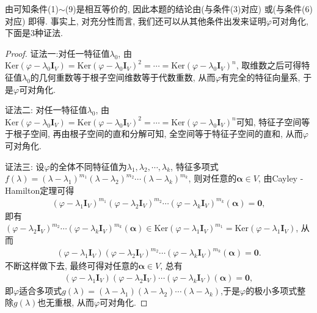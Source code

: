 \documentclass[../../main.tex]{subfiles}%
\begin{document}
\begin{note}
由可知条件(1)$\sim$(9)是相互等价的, 因此本题的结论由(与条件(3)对应) 或(与条件(6)对应) 即得. 事实上, 对充分性而言, 我们还可以从其他条件出发来证明\(\varphi\)可对角化, 下面是\(3\)种证法.
\end{note}
\begin{proof}

{\color{blue}证法一:}对任一特征值\(\lambda_{0}\), 由\(\mathrm{Ker}(\varphi-\lambda_{0}\boldsymbol{I}_{V})=\mathrm{Ker}(\varphi-\lambda_{0}\boldsymbol{I}_{V})^{2}=\cdots=\mathrm{Ker}(\varphi-\lambda_{0}\boldsymbol{I}_{V})^{n}\), 取维数之后可得特征值\(\lambda_{0}\)的几何重数等于根子空间维数等于代数重数, 从而\(\varphi\)有完全的特征向量系, 于是\(\varphi\)可对角化.
    
{\color{blue}证法二:} 对任一特征值\(\lambda_{0}\), 由\(\mathrm{Ker}(\varphi-\lambda_{0}\boldsymbol{I}_{V})=\mathrm{Ker}(\varphi-\lambda_{0}\boldsymbol{I}_{V})^{2}=\cdots=\mathrm{Ker}(\varphi-\lambda_{0}\boldsymbol{I}_{V})^{n}\)可知, 特征子空间等于根子空间, 再由根子空间的直和分解可知, 全空间等于特征子空间的直和, 从而\(\varphi\)可对角化.

{\color{blue}证法三:} 设\(\varphi\)的全体不同特征值为\(\lambda_{1},\lambda_{2},\cdots,\lambda_{k}\), 特征多项式\(f(\lambda)=(\lambda-\lambda_{1})^{m_{1}}(\lambda-\lambda_{2})^{m_{2}}\cdots(\lambda-\lambda_{k})^{m_{k}}\), 则对任意的\(\boldsymbol{\alpha}\in V\), 由Cayley - Hamilton定理可得
\begin{align*}
(\varphi-\lambda_{1}\boldsymbol{I}_{V})^{m_{1}}(\varphi-\lambda_{2}\boldsymbol{I}_{V})^{m_{2}}\cdots(\varphi-\lambda_{k}\boldsymbol{I}_{V})^{m_{k}}(\boldsymbol{\alpha}) = \boldsymbol{0},
\end{align*}
即有\((\varphi-\lambda_{2}\boldsymbol{I}_{V})^{m_{2}}\cdots(\varphi-\lambda_{k}\boldsymbol{I}_{V})^{m_{k}}(\boldsymbol{\alpha})\in\mathrm{Ker}(\varphi-\lambda_{1}\boldsymbol{I}_{V})^{m_{1}}=\mathrm{Ker}(\varphi-\lambda_{1}\boldsymbol{I}_{V})\), 从而
\begin{align*}
(\varphi-\lambda_{1}\boldsymbol{I}_{V})(\varphi-\lambda_{2}\boldsymbol{I}_{V})^{m_{2}}\cdots(\varphi-\lambda_{k}\boldsymbol{I}_{V})^{m_{k}}(\boldsymbol{\alpha}) = \boldsymbol{0}.
\end{align*}
不断这样做下去, 最终可得对任意的\(\boldsymbol{\alpha}\in V\), 总有
\begin{align*}
(\varphi-\lambda_{1}\boldsymbol{I}_{V})(\varphi-\lambda_{2}\boldsymbol{I}_{V})\cdots(\varphi-\lambda_{k}\boldsymbol{I}_{V})(\boldsymbol{\alpha}) = \boldsymbol{0},
\end{align*}
即\(\varphi\)适合多项式\(g(\lambda)=(\lambda-\lambda_{1})(\lambda-\lambda_{2})\cdots(\lambda-\lambda_{k})\),于是$\varphi$的极小多项式整除$g(\lambda)$也无重根, 从而\(\varphi\)可对角化. 

\end{proof}
\end{document}
